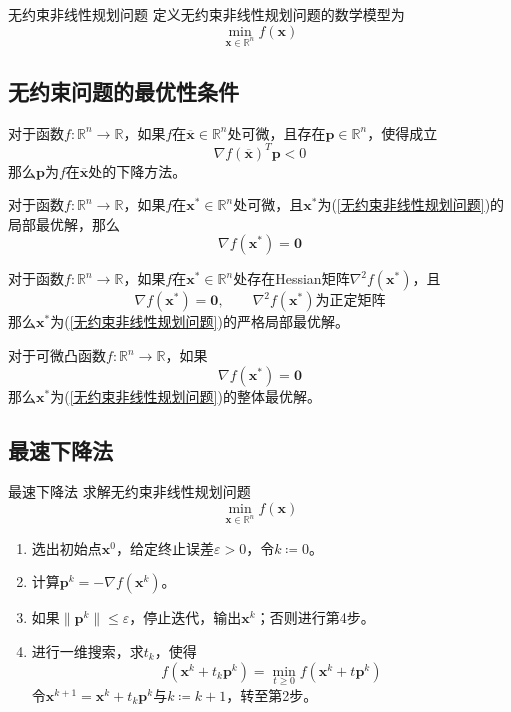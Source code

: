 \documentclass[lang = cn, scheme = chinese, thmcnt = section]{elegantbook}
\newcommand{\R}{\mathbb{R}}            %
\newcommand{\bs}{\boldsymbol}          %
\begin{document}
\begin{definition}{无约束非线性规划问题}
	定义无约束非线性规划问题的数学模型为
	\begin{equation}
		\label{无约束非线性规划问题}
		\min_{\bs{x}\in\R^n} f(\bs{x})
		\tag{UMP}
	\end{equation}
\end{definition}

\subsection{无约束问题的最优性条件}

\begin{theorem}
	对于函数$f:\R^n\to\R$，如果$f$在$\overline{\bs{x}}\in\R^n$处可微，且存在$\bs{p}\in\R^n$，使得成立
	$$
	\nabla f(\overline{\bs{x}})^T\bs{p}<0
	$$
	那么$\bs{p}$为$f$在$\overline{\bs{x}}$处的下降方法。
\end{theorem}

\begin{theorem}
	对于函数$f:\R^n\to\R$，如果$f$在$\bs{x}^*\in\R^n$处可微，且$\bs{x}^*$为(\ref{无约束非线性规划问题})的局部最优解，那么
	$$
	\nabla f(\bs{x}^*)=\bs{0}
	$$
\end{theorem}

\begin{theorem}
	对于函数$f:\R^n\to\R$，如果$f$在$\bs{x}^*\in\R^n$处存在Hessian矩阵$\nabla^2 f(\bs{x}^*)$，且
	$$
	\nabla f(\bs{x}^*)=\bs{0},\qquad
	\nabla^2 f(\bs{x}^*)\text{为正定矩阵}
	$$
	那么$\bs{x}^*$为(\ref{无约束非线性规划问题})的严格局部最优解。
\end{theorem}

\begin{theorem}
	对于可微凸函数$f:\R^n\to\R$，如果
	$$
	\nabla f(\bs{x}^*)=\bs{0}
	$$
	那么$\bs{x}^*$为(\ref{无约束非线性规划问题})的整体最优解。
\end{theorem}

\subsection{最速下降法}

\begin{theorem}{最速下降法}
	求解无约束非线性规划问题
	$$
	\min_{\bs{x}\in\R^n} f(\bs{x})
	$$
	\begin{enumerate}
		\item 选出初始点$\bs{x}^0$，给定终止误差$\varepsilon>0$，令$k\coloneqq 0$。
		\item 计算$\bs{p}^k=-\nabla f(\bs{x}^k)$。
		\item 如果$\|\bs{p}^k\|\le\varepsilon$，停止迭代，输出$\bs{x}^k$；否则进行第4步。
		\item 进行一维搜索，求$t_k$，使得
		$$
		f(\bs{x}^k+t_k\bs{p}^k)
		=\min_{t\ge 0}f(\bs{x}^k+t\bs{p}^k)
		$$
		令$\bs{x}^{k+1}=\bs{x}^k+t_k\bs{p}^k$与$k\coloneqq k+1$，转至第2步。
	\end{enumerate}
\end{theorem}
\end{document}
